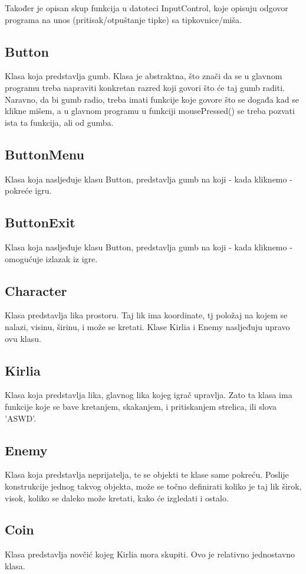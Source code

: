 \documentclass[12pt]{article}
\begin{document}
Također je opisan skup funkcija u datoteci InputControl, koje opisuju odgovor programa na unos (pritisak/otpuštanje tipke) sa tipkovnice/miša.

\subsection{Button}
Klasa koja predstavlja gumb. Klasa je abstraktna, što znači da se u glavnom programu treba napraviti konkretan razred koji govori što će taj gumb raditi. Naravno, da bi gumb radio, treba imati funkcije koje govore što se događa kad se klikne mišem, a u glavnom programu u funkciji mousePressed() se treba pozvati ista ta funkcija, ali od gumba.
\subsection{ButtonMenu}
Klasa koja nasljeđuje klasu Button, predstavlja gumb na koji - kada kliknemo - pokreće igru.
\subsection{ButtonExit}
Klasa koja nasljeđuje klasu Button, predstavlja gumb na koji - kada kliknemo - omogućuje izlazak iz igre. 
\subsection{Character}
Klasa predstavlja lika prostoru. Taj lik ima koordinate, tj položaj na kojem se nalazi, visinu, širinu, i može se kretati. Klase Kirlia i Enemy nasljeđuju upravo ovu klasu.
\subsection{Kirlia}
Klasa koja predstavlja lika, glavnog lika kojeg igrač upravlja. Zato ta klasa ima funkcije koje se bave kretanjem, skakanjem, i pritiskanjem strelica, ili slova 'ASWD'.
\subsection{Enemy}
Klasa koja predstavlja neprijatelja, te se objekti te klase same pokreću. Poslije konstrukcije jednog takvog objekta, može se točno definirati koliko je taj lik širok, visok, koliko se daleko može kretati, kako će izgledati i ostalo.
\subsection{Coin}
Klasa predstavlja novčić kojeg Kirlia mora skupiti. Ovo je relativno jednostavno klasa.
\end{document}
